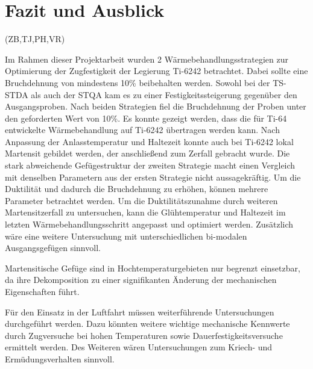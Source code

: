 \chapter{Fazit und Ausblick}

(ZB,TJ,PH,VR)

Im Rahmen dieser Projektarbeit wurden 2 Wärmebehandlungsstrategien zur Optimierung der Zugfestigkeit der Legierung Ti-6242 betrachtet. Dabei sollte eine Bruchdehnung von mindestens 10\% beibehalten werden. 
Sowohl bei der TS-STDA als auch der STQA kam es zu einer Festigkeitssteigerung gegenüber den Ausgangsproben.
Nach beiden Strategien fiel die Bruchdehnung der Proben unter den geforderten Wert von 10\%. Es konnte gezeigt werden, dass die für Ti-64 entwickelte Wärmebehandlung auf Ti-6242 übertragen werden kann. Nach Anpassung der Anlasstemperatur und Haltezeit konnte auch bei Ti-6242 lokal Martensit gebildet werden, der anschließend zum Zerfall gebracht wurde. Die stark abweichende Gefügestruktur der zweiten Strategie macht einen Vergleich mit denselben Parametern aus der ersten Strategie nicht aussagekräftig.
Um die Duktilität und dadurch die Bruchdehnung zu erhöhen, können mehrere Parameter betrachtet werden. Um die  Duktilitätszunahme durch weiteren Martensitzerfall zu untersuchen, kann die Glühtemperatur und Haltezeit im letzten Wärmebehandlungsschritt angepasst und optimiert werden. Zusätzlich wäre eine weitere Untersuchung mit unterschiedlichen bi-modalen Ausgangsgefügen sinnvoll.

Martensitische Gefüge sind in Hochtemperaturgebieten nur begrenzt einsetzbar, da ihre Dekomposition zu einer signifikanten Änderung der mechanischen Eigenschaften führt.

Für den Einsatz in der Luftfahrt müssen weiterführende Untersuchungen durchgeführt werden. Dazu könnten weitere wichtige mechanische Kennwerte durch Zugversuche bei hohen Temperaturen sowie Dauerfestigkeitsversuche ermittelt werden.
Des Weiteren wären Untersuchungen zum Kriech- und Ermüdungsverhalten sinnvoll.